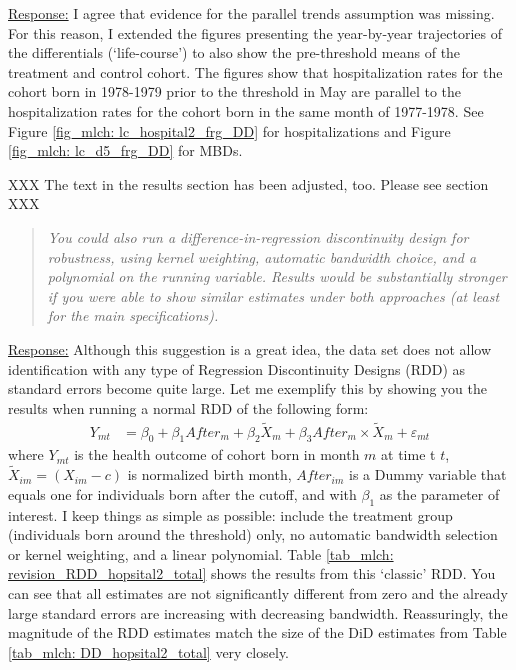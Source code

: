 \underline{Response:} I agree that evidence for the parallel trends assumption was missing. For this reason, I extended the figures presenting the year-by-year trajectories of the differentials (`life-course') to also show the pre-threshold means of the treatment and control cohort. The figures show that hospitalization rates for the cohort born in 1978-1979 prior to the threshold in May are parallel to the hospitalization rates for the cohort born in the same month of 1977-1978. See Figure \ref{fig_mlch: lc_hospital2_frg_DD} for hospitalizations and Figure \ref{fig_mlch: lc_d5_frg_DD} for MBDs. 

XXX The text in the results section has been adjusted, too. Please see section XXX


\begin{quote}
	\textit{You could also run a difference-in-regression discontinuity design for robustness, using kernel weighting, automatic bandwidth choice, and a polynomial on the running variable. Results would be substantially stronger if you were able to show similar estimates under both approaches (at least for the main specifications).}
\end{quote}
\underline{Response:}
Although this suggestion is a great idea, the data set does not allow identification with any type of Regression Discontinuity Designs (RDD) as standard errors become quite large. Let me exemplify this by showing you the results when running a normal RDD of the following form: 
\begin{align}
Y_{mt} &= \beta_0 + \beta_1 After_{m} + \beta_2 \tilde X_{m} + \beta_3 After_{m} \times \tilde X_{m} + \varepsilon_{mt} \label{eq:RD}
\end{align}
where $Y_{mt}$ is the health outcome of cohort born in month $m$ at time t $t$, $\tilde X_{im}=(X_{im}-c)$ is normalized birth month, $After_{im}$ is a Dummy variable that equals one for individuals born after the cutoff, and with $\beta_1$ as the parameter of interest. I keep things as simple as possible: include the treatment group (individuals born around the threshold) only, no automatic bandwidth selection or kernel weighting, and a linear polynomial. Table \ref{tab_mlch: revision_RDD_hopsital2_total} shows the results from this `classic' RDD. You can see that all estimates are not significantly different from zero and the already large standard errors are increasing with decreasing bandwidth. Reassuringly, the magnitude of the RDD estimates match the size of the DiD estimates from Table \ref{tab_mlch: DD_hopsital2_total} very closely. 


